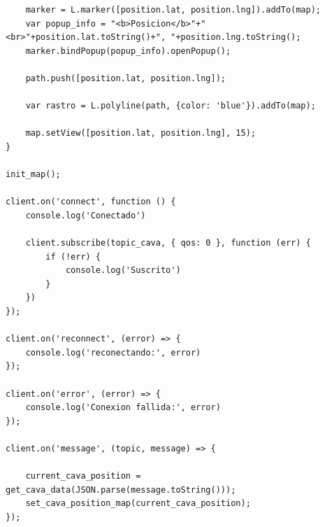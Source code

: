 \begin{lstlisting}
    marker = L.marker([position.lat, position.lng]).addTo(map);
    var popup_info = "<b>Posicion</b>"+"<br>"+position.lat.toString()+", "+position.lng.toString();
    marker.bindPopup(popup_info).openPopup();

    path.push([position.lat, position.lng]);

    var rastro = L.polyline(path, {color: 'blue'}).addTo(map);

    map.setView([position.lat, position.lng], 15);
}

init_map();

client.on('connect', function () {
    console.log('Conectado')
   
    client.subscribe(topic_cava, { qos: 0 }, function (err) {
        if (!err) {
            console.log('Suscrito')
        }
    })
});

client.on('reconnect', (error) => {
    console.log('reconectando:', error)
});

client.on('error', (error) => {
    console.log('Conexion fallida:', error)
});

client.on('message', (topic, message) => {
   
    current_cava_position = get_cava_data(JSON.parse(message.toString()));
    set_cava_position_map(current_cava_position);
});

\end{lstlisting}
\label{cod:aplicacion_web_js}





